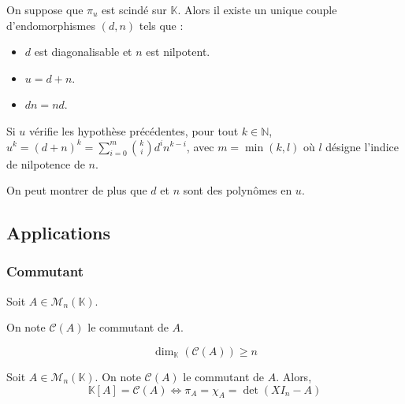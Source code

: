 
  \begin{theorem}
    On suppose que $\pi_u$ est scindé sur $\mathbb{K}$. Alors il existe un unique couple d'endomorphismes $(d, n)$ tels que :
    \begin{itemize}
      \item $d$ est diagonalisable et $n$ est nilpotent.
      \item $u = d + n$.
      \item $d n = n d$.
    \end{itemize}
  \end{theorem}

  \begin{corollary}
    Si $u$ vérifie les hypothèse précédentes, pour tout $k \in \mathbb{N}$, $u^k = (d + n)^k = \sum_{i=0}^m \binom{k}{i} d^i n^{k-i}$, avec $m = \min(k, l)$ où $l$ désigne l'indice de nilpotence de $n$.
  \end{corollary}

  \begin{remark}
    On peut montrer de plus que $d$ et $n$ sont des polynômes en $u$.
  \end{remark}

  \subsection{Applications}

  \subsubsection{Commutant}


  Soit $A \in \mathcal{M}_n(\mathbb{K})$.

  \begin{notation}
    On note $\mathcal{C}(A)$ le commutant de $A$.
  \end{notation}

  \begin{lemma}
    \[ \dim_{\mathbb{K}}(\mathcal{C}(A)) \geq n \]
  \end{lemma}


  \begin{application}
    Soit $A \in \mathcal{M}_n(\mathbb{K})$. On note $\mathcal{C}(A)$ le commutant de $A$. Alors,
    \[ \mathbb{K}[A] = \mathcal{C}(A) \iff \pi_A = \chi_A = \det(XI_n - A) \]
  \end{application}

